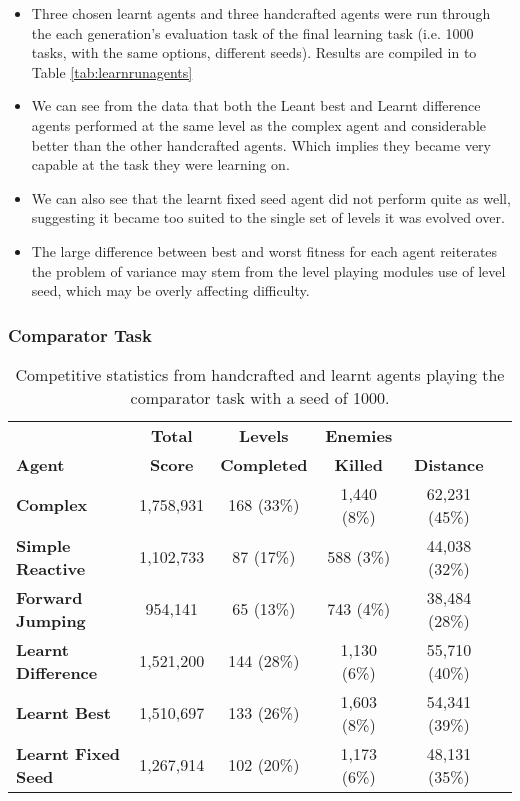 \begin{itemize}
\item Three chosen learnt agents and three handcrafted agents were run through the each generation's evaluation task of the final learning task (i.e. 1000 tasks, with the same options, different seeds). Results are compiled in to Table \ref{tab:learnrunagents}
\item We can see from the data that both the Leant best and Learnt difference agents performed at the same level as the complex agent and considerable better than the other handcrafted agents. Which implies they became very capable at the task they were learning on.
\item We can also see that the learnt fixed seed agent did not perform quite as well, suggesting it became too suited to the single set of levels it was evolved over.
\item The large difference between best and worst fitness for each agent reiterates the problem of variance may stem from the level playing modules use of level seed, which may be overly affecting difficulty.
\end{itemize}

\clearpage
\subsubsection{Comparator Task}

\begin{table}
  \begin{adjustwidth}{-0cm}{-0cm}
  \begin{center} \small
    \begin{tabular}{ | l | c | c | c | c | c |}
    \hline
    & \textbf{Total} & \textbf{Levels} & \textbf{Enemies} & \Tstrut \\
    \textbf{Agent} & \textbf{Score} & \textbf{Completed} & \textbf{Killed} & \textbf{Distance} \Bstrut \\ \thickhline
    \textbf{Complex} & 1,758,931 & 168 (33\%) & 1,440 (8\%) & 62,231 (45\%) \\ \hline
    \textbf{Simple Reactive} & 1,102,733 & 87 (17\%) & 588 (3\%) & 44,038 (32\%) \\ \hline
    \textbf{Forward Jumping} & 954,141 & 65 (13\%) & 743 (4\%) & 38,484 (28\%) \\ \thickhline
    \textbf{Learnt Difference} & 1,521,200 & 144 (28\%) & 1,130 (6\%) & 55,710 (40\%) \\ \hline
    \textbf{Learnt Best} & 1,510,697 & 133 (26\%) & 1,603 (8\%) & 54,341 (39\%) \\ \hline
    \textbf{Learnt Fixed Seed} & 1,267,914 & 102 (20\%) & 1,173 (6\%) & 48,131 (35\%) \\ \hline
    \end{tabular}
  \end{center}
  \end{adjustwidth}
  \caption{\small Competitive statistics from handcrafted and learnt agents playing the comparator task with a seed of 1000.}
  \label{tab:learnagentcomp}
\end{table}

